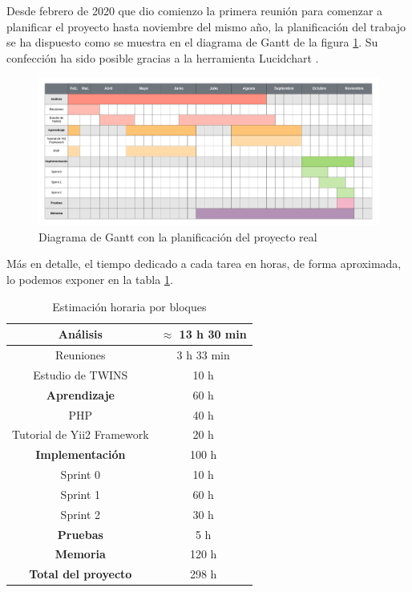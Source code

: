 Desde febrero de 2020 que dio comienzo la primera reunión para comenzar a planificar el proyecto hasta noviembre del mismo año, la planificación del trabajo se ha dispuesto como se muestra en el diagrama de Gantt de la figura \ref{fig:gantt}. Su confección ha sido posible gracias a la herramienta Lucidchart \cite{lucidchart}.

\begin{figure}
	\centering
	\includegraphics[width=\textwidth]{img/gantt.png}
	\caption[Diagrama de Gantt]{Diagrama de Gantt con la planificación del proyecto real}
	\label{fig:gantt}
\end{figure}

Más en detalle, el tiempo dedicado a cada tarea en horas, de forma aproximada, lo podemos exponer en la tabla \ref{tab:horas}.

\begin{table}[h]
	\begin{center}
		\begin{tabular}{ | c | c | } 
			\hline
			\textbf{Análisis} & $\approx$ 13 h 30 min \\
			\hline
			Reuniones & 3 h 33 min \\ 
			\hline
			Estudio de TWINS & 10 h \\
			\hline
			\textbf{Aprendizaje}  & 60 h \\ 
			\hline
			PHP & 40 h \\ 
			\hline
			Tutorial de Yii2 Framework & 20 h \\
			\hline
			\textbf{Implementación} & 100 h \\
			\hline
			Sprint 0 \footnotemark & 10 h \\
			\hline
			Sprint 1 & 60 h \\
			\hline
			Sprint 2 & 30 h \\
			\hline
			\textbf{Pruebas} & 5 h\\
			\hline
			\textbf{Memoria} & 120 h \\
			\hline
			\textbf{Total del proyecto} & 298 h \\
			\hline
		\end{tabular}
		\caption{Estimación horaria por bloques}
		\label{tab:horas}
	\end{center}
\end{table}~

